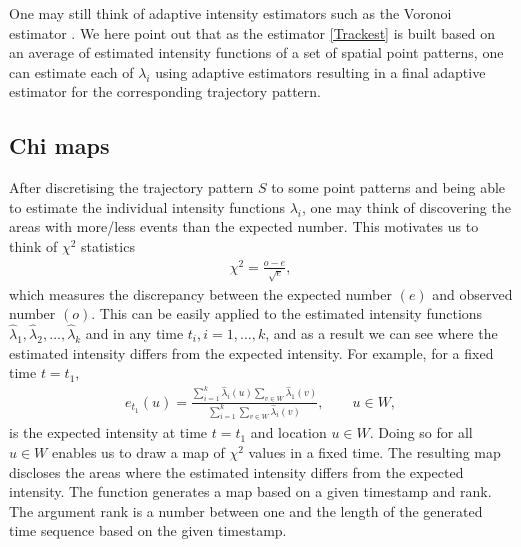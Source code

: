\documentclass[article]{jss}
\begin{document}
One may still think of adaptive intensity estimators such as the Voronoi estimator \citep{Ord78,BSV10}. We here point out that as the estimator \eqref{Trackest} is built based on an average of estimated intensity functions of a set of spatial point patterns, one can estimate each of $\lambda_i$ using adaptive estimators resulting in a final adaptive estimator for the corresponding trajectory pattern.
  \subsection{Chi maps}
  After discretising the trajectory pattern $S$ to some point patterns and being able to estimate the individual intensity functions $\lambda_i$, one may think of discovering the areas with more/less events than the expected number. This motivates us to think of $\chi^2$ statistics 
  \begin{eqnarray}\label{chistat}
  \chi^2 =\frac{o-e}{\sqrt[]{e}},
  \end{eqnarray}
  which measures the discrepancy between the expected number $(e)$ and observed number $(o)$. This can be easily applied to the estimated intensity functions $\widehat{\lambda}_1,\widehat{\lambda}_2,\ldots,\widehat{\lambda}_k$ and in any time $t_i, i=1,\ldots,k$, and as a result we can see where the estimated intensity differs from the expected intensity. For example, for a fixed time $t=t_1$,
  \begin{eqnarray*}
  e_{t_1}(u)=\frac{\sum\limits_{i=1}^k \widehat{\lambda}_i(u) \sum\limits_{v \in W} \widehat{\lambda}_1(v)}{\sum\limits_{i=1}^{k}\sum\limits_{v \in W} \widehat{\lambda}_i (v)}, \qquad u \in W,
  \end{eqnarray*}
  is the expected intensity at time $t=t_1$ and location $u \in W$. Doing so for all $u \in W$ enables us to draw a map of $\chi^2$ values in a fixed time. The resulting map discloses the areas where the estimated intensity differs from the expected intensity. The function  generates a map based on a given timestamp and rank. The argument rank is a number between one and the length of the generated time sequence based on the given timestamp.
  
\end{document}
